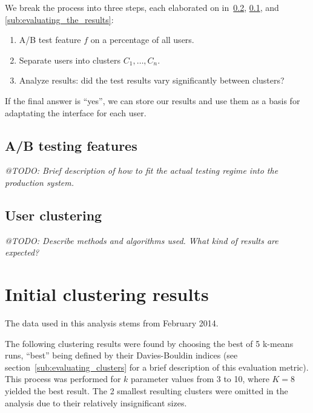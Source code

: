We break the process into three steps, each elaborated on in~\ref{sub:clustering_of_users}, \ref{sub:a_b_testing_features}, and \ref{sub:evaluating_the_results}:

\begin{enumerate}
  \item A/B test feature $f$ on a percentage of all users.
  \item Separate users into clusters $C_1, \ldots, C_n$.
  \item Analyze results: did the test results vary significantly between clusters?
\end{enumerate}

If the final answer is ``yes'', we can store our results and use them as a basis for adaptating the interface for each user.

\subsection{A/B testing features} %
\label{sub:a_b_testing_features}

\emph{@TODO: Brief description of how to fit the actual testing regime into the production system.}


\subsection{User clustering} %
\label{sub:clustering_of_users}

\emph{@TODO: Describe methods and algorithms used. What kind of results are expected?}




\section{Initial clustering results}
\label{sec:clustering_results}

The data used in this analysis stems from February 2014.

The following clustering results were found by choosing the best of 5 k-means runs, ``best'' being defined by their Davies-Bouldin indices (see section~\ref{sub:evaluating_clusters} for a brief description of this evaluation metric). This process was performed for $k$ parameter values from 3 to 10, where $K = 8$ yielded the best result. The 2 smallest resulting clusters were omitted in the analysis due to their relatively insignificant sizes.

